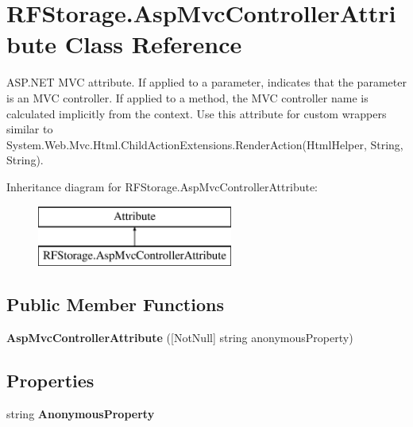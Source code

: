 \section{R\+F\+Storage.\+Asp\+Mvc\+Controller\+Attribute Class Reference}
\label{class_r_f_storage_1_1_asp_mvc_controller_attribute}


A\+S\+P.\+N\+ET M\+VC attribute. If applied to a parameter, indicates that the parameter is an M\+VC controller. If applied to a method, the M\+VC controller name is calculated implicitly from the context. Use this attribute for custom wrappers similar to {\ttfamily System.\+Web.\+Mvc.\+Html.\+Child\+Action\+Extensions.\+Render\+Action(\+Html\+Helper, String, String)}.  


Inheritance diagram for R\+F\+Storage.\+Asp\+Mvc\+Controller\+Attribute\+:\begin{figure}[H]
\begin{center}
\leavevmode
\includegraphics[height=2.000000cm]{class_r_f_storage_1_1_asp_mvc_controller_attribute}
\end{center}
\end{figure}
\subsection*{Public Member Functions}
\begin{DoxyCompactItemize}
\item 
\mbox{\label{class_r_f_storage_1_1_asp_mvc_controller_attribute_a1c0328c91b4d4dc9f9bdd2b2ce97d97e}} 
{\bfseries Asp\+Mvc\+Controller\+Attribute} ([Not\+Null] string anonymous\+Property)
\end{DoxyCompactItemize}
\subsection*{Properties}
\begin{DoxyCompactItemize}
\item 
\mbox{\label{class_r_f_storage_1_1_asp_mvc_controller_attribute_a72c379ac339e80e412743eb6018dc811}} 
string {\bfseries Anonymous\+Property}\hspace{0.3cm}{\ttfamily  [get]}
\end{DoxyCompactItemize}



